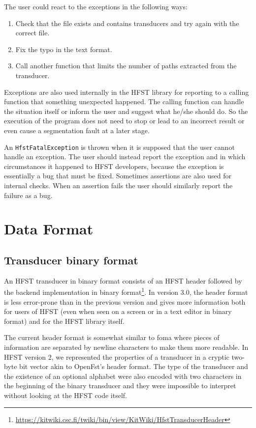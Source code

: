 \documentclass{llncs}
\begin{document}
The user could react to the exceptions in the following ways:

\begin{enumerate} 
\item Check that the file exists and contains transducers and try again
with the correct file.
\item Fix the typo in the text format.
\item Call another function that limits the number of paths extracted
from the transducer.
\end{enumerate} 

Exceptions are also used internally in the HFST library for reporting to a 
calling function that something unexpected happened. The calling
function can handle the situation itself or inform the user and suggest
what he/she should do. 
So the execution of the program does not need to stop or lead to an
incorrect result or even cause a segmentation fault at a later stage.

An \texttt{HfstFatalException} is thrown when it is supposed that the user
cannot handle an exception. The user should instead report the exception
and in which circumstances it happened to HFST developers, because the exception
is essentially a bug that must be fixed. Sometimes assertions are also
used for internal checks. When an assertion fails the user should similarly
report the failure as a bug.


\section{Data Format}

\subsection{Transducer binary format}

An HFST transducer in binary format consists of an HFST header followed by the
backend implementation in binary 
format\footnote{\url{https://kitwiki.csc.fi/twiki/bin/view/KitWiki/HfstTransducerHeader}}. 
In version 3.0, the header
format is less error-prone than in the previous version and gives more 
information both for users of HFST (even when seen on a screen or in a
text editor in binary format) and for the HFST library itself.
 
The current header format is somewhat similar to foma where pieces of 
information are separated by newline characters to make them more
readable. In HFST version 2, we represented the properties of a
transducer in a cryptic two-byte bit vector akin to OpenFst's header
format. The type of the transducer and the existence of an optional
alphabet were also encoded with two characters in the beginning of the
binary transducer and they were impossible to interpret without
looking at the HFST code itself.
\end{document}
